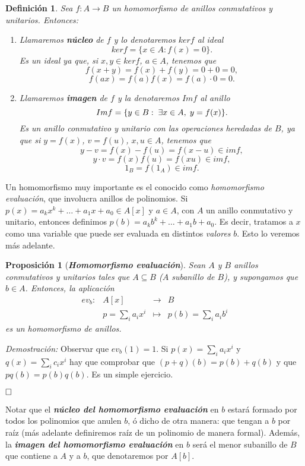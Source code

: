 \documentclass[12pt]{article}
\newtheorem{proposition}[theorem]{Proposición}
\newtheorem{definition}[theorem]{Definición}
\begin{document}
\begin{definition} Sea $f \colon A \longrightarrow B$ un homomorfismo de anillos conmutativos y unitarios. Entonces: \begin{enumerate}
\item Llamaremos \textbf{núcleo} de $f$ y lo denotaremos \textbf{$ker f$} al ideal $$ker f = \lbrace x \in A:  f(x) = 0 \rbrace.$$ Es un ideal ya que, si $x,y \in ker f$, $a \in A$, tenemos que $$f(x+y) = f(x) + f(y) = 0 +0 = 0,$$ $$f(ax)=f(a) f(x) = f(a) \cdot 0 = 0.$$
\item Llamaremos \textbf{imagen} de $f$ y la denotaremos \textbf{$Im f$} al anillo $$Im f = \lbrace y \in B: \hspace{0.1cm} \exists x \in A, \hspace{0.1cm} y = f(x) \rbrace.$$
Es un anillo conmutativo y unitario con las operaciones heredadas de $B$, ya que si $y = f(x)$, $v = f(u)$, $x, u \in A$, tenemos que $$y-v = f(x) - f(u) = f(x-u) \in im f,$$ $$y \cdot v = f(x)f(u) = f(x u) \in im f,$$ $$1_{B} = f(1_{A}) \in imf.$$
\end{enumerate}
\end{definition}

Un homomorfismo muy importante es el conocido como \textit{homomorfismo evaluación}, que involucra anillos de polinomios. Si $p(x) = a_kx^k + \ldots + a_1x+a_0 \in A[x]$ y $a \in A$, con $A$ un anillo conmutativo y unitario, entonces definimos $p(b)=a_kb^k + \ldots + a_1b +a_0$. Es decir, tratamos a $x$ como una variable que puede ser evaluada en distintos \textit{valores} $b$. Esto lo veremos más adelante.

\begin{proposition}[\textbf{\textit{Homomorfismo evaluación}}]
Sean $A$ y $B$ anillos conmutativos y unitarios tales que $A \subseteq B$ ($A$ subanillo de $B$), y supongamos que $b \in A$. Entonces, la aplicación $$\begin{array}{rccl}
ev_b \colon &A[x]&\longrightarrow &B \\
&p=\sum_ia_ix^i& \longmapsto &p(b)=\sum_i a_ib^i
\end{array}
$$ es un homomorfismo de anillos.
\end{proposition}
\emph{Demostración: }Observar que $ev_b(1) = 1$. Si $p(x) = \sum_i a_ix^i$ y $q(x) = \sum_i c_ix^i$ hay que comprobar que $(p+q)(b)=p(b)+q(b)$ y que $pq(b) = p(b)q(b)$. Es un simple ejercicio.

$\hfill \square$

Notar que el \textit{\textbf{núcleo del homomorfismo evaluación}} en $b$ estará formado por todos los polinomios que anulen $b$, ó dicho de otra manera: que tengan a $b$ por raíz (más adelante definiremos raíz de un polinomio de manera formal). Además, la \textbf{\textit{imagen del homomorfismo evaluación}} en $b$ será el menor subanillo de $B$ que contiene a $A$ y a $b$, que denotaremos por $A[b]$.
\end{document}
